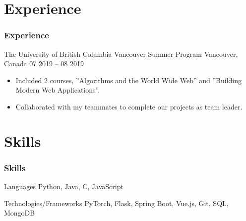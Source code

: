 \documentclass{beamer}
\begin{document}

\section{Experience}
\begin{frame}
    \frametitle{Experience}
    \begin{block}{The University of British Columbia Vancouver Summer Program}
        Vancouver, Canada \hfill 07 2019 – 08 2019
        \begin{itemize}
            \item Included 2 courses, ”Algorithms and the World Wide Web” and ”Building Modern Web Applications”.
            \item Collaborated with my teammates to complete our projects as team leader.
        \end{itemize}
    \end{block}
\end{frame}


\section{Skills}
\begin{frame}
    \frametitle{Skills}
    \begin{block}{Languages}
        Python, Java, C, JavaScript
    \end{block}
    \begin{block}{Technologies/Frameworks}
        PyTorch, Flask, Spring Boot, Vue.js, Git, SQL, MongoDB
    \end{block}
\end{frame}
\end{document}
